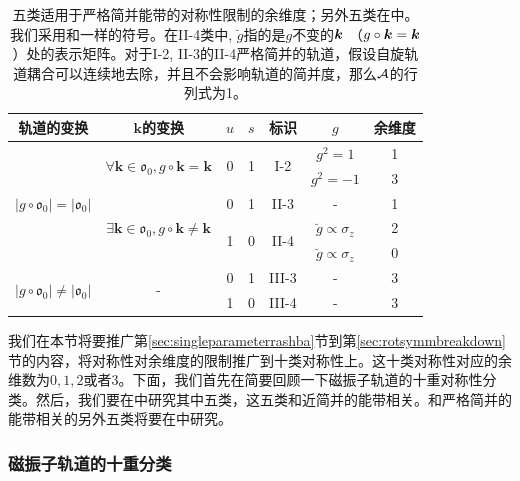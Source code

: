 \begin{table}
	\begin{tabular}{|c|c|c|c|c|c|c|}
	\hline 
	轨道的变换 & $\boldsymbol{k}$的变换  & $u$ & $s$  & 标识 & $g$  & 余维度\tabularnewline
	\hline 
	\multirow{5}{*}{$|g\circ\mathfrak{o}_{0}|=|\mathfrak{o}_{0}|$} & \multirow{2}{*}{$\forall\boldsymbol{k}\in\mathfrak{o}_{0},g\circ\boldsymbol{k}=\boldsymbol{k}$} & \multirow{2}{*}{0} & \multirow{2}{*}{1} & \multirow{2}{*}{I-2} & $g^{2}=1$  & 1\tabularnewline
	\cline{6-7} 
	 &  &  &  &  & $g^{2}=-1$  & 3\tabularnewline
	\cline{2-7} 
	 & \multirow{3}{*}{$\exists\boldsymbol{k}\in\mathfrak{o}_{0},g\circ\boldsymbol{k}\neq\boldsymbol{k}$} & 0 & 1 & II-3 & - & 1\tabularnewline
	\cline{3-7} 
	 &  & \multirow{2}{*}{1} & \multirow{2}{*}{0} & \multirow{2}{*}{II-4} & $\breve{g}\propto\sigma_{z}$  & 2\tabularnewline
	\cline{6-7} 
	 &  &  &  &  & $\breve{g}\propto\sigma_{z}$  & 0\tabularnewline
	\hline 
	\multirow{2}{*}{$|g\circ\mathfrak{o}_{0}|\neq|\mathfrak{o}_{0}|$ } & \multirow{2}{*}{-} & 0 & 1 & III-3 & - & 3\tabularnewline
	\cline{3-7} 
	 &  & 1 & 0 & III-4 & - & 3\tabularnewline
	\hline 
	\end{tabular}
	\centering
	\caption{五类适用于严格简并能带的对称性限制的余维度；另外五类在中。我们采用和一样的符号。在II-4类中, $\breve g$指的是$g$不变的$\boldsymbol{k}$ （$g\circ\boldsymbol{k}=\boldsymbol{k}$）处的表示矩阵。对于I-2, II-3的II-4严格简并的轨道，假设自旋轨道耦合可以连续地去除，并且不会影响轨道的简并度，那么${\cal A}$的行列式为1\cite{topoferm}。\label{table:codimension-exactlydegen}}
\end{table}

我们在本节将要推广第\ref{sec:singleparameterrashba}节到第\ref{sec:rotsymmbreakdown}节的内容，将对称性对余维度的限制推广到十类对称性上\cite{topoferm}。这十类对称性对应的余维数为$0,1,2$或者$3$。下面，我们首先在简要回顾一下磁振子轨道的十重对称性分类。然后，我们要在中研究其中五类，这五类和近简并的能带相关。和严格简并的能带相关的另外五类将要在中研究。

\subsubsection{磁振子轨道的十重分类}\label{sec:reviewtenfold}

